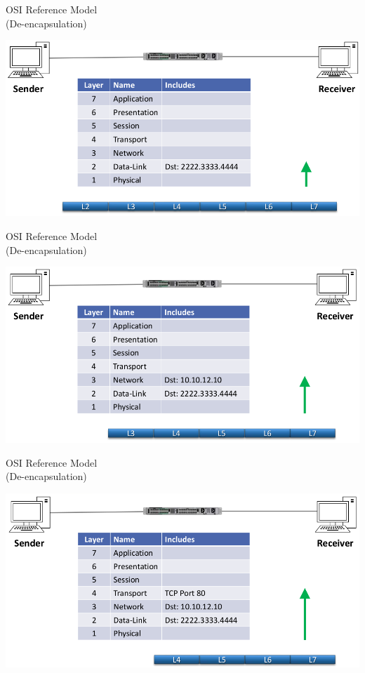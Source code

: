 \documentclass[pdflatex,compress,mathserif]{beamer}
\begin{document}
\begin{frame}{OSI Reference Model\\(De-encapsulation)}
	\begin{center}
		\includegraphics[width=\linewidth]{img/img56}
	\end{center}
\end{frame}

\begin{frame}{OSI Reference Model\\(De-encapsulation)}
	\begin{center}
		\includegraphics[width=\linewidth]{img/img57}
	\end{center}
\end{frame}

\begin{frame}{OSI Reference Model\\(De-encapsulation)}
	\begin{center}
		\includegraphics[width=\linewidth]{img/img58}
	\end{center}
\end{frame}
\end{document}
